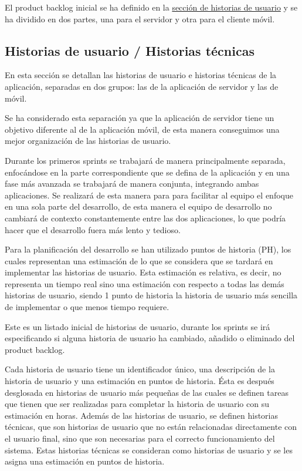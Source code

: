 El product backlog inicial se ha definido en la \hyperref[sec:historias-de-usuario]{sección de historias de usuario} y se ha dividido en dos partes, una para el servidor y otra para el cliente móvil.

\subsection{Historias de usuario / Historias técnicas}
\label{sec:historias-de-usuario}
En esta sección se detallan las historias de usuario e historias técnicas de la aplicación, separadas en dos grupos: las de la aplicación de servidor y las de móvil.

Se ha considerado esta separación ya que la aplicación de servidor tiene un objetivo diferente al de la aplicación móvil, de esta manera conseguimos una mejor organización de las historias de usuario.

Durante los primeros sprints se trabajará de manera principalmente separada, enfocándose en la parte correspondiente que se defina de la aplicación y en una fase más avanzada se trabajará de manera conjunta, integrando ambas aplicaciones. Se realizará de esta manera para para facilitar al equipo el enfoque en una sola parte del desarrollo, de esta manera el equipo de desarrollo no cambiará de contexto constantemente entre las dos aplicaciones, lo que podría hacer que el desarrollo fuera más lento y tedioso.

Para la planificación del desarrollo se han utilizado puntos de historia (PH), los cuales representan una estimación de lo que se considera que se tardará en implementar las historias de usuario. Esta estimación es relativa, es decir, no representa un tiempo real sino una estimación con respecto a todas las demás historias de usuario, siendo 1 punto de historia la historia de usuario más sencilla de implementar o que menos tiempo requiere.

Este es un listado inicial de historias de usuario, durante los sprints se irá especificando si alguna historia de usuario ha cambiado, añadido o eliminado del product backlog.

Cada historia de usuario tiene un identificador único, una descripción de la historia de usuario y una estimación en puntos de historia. Ésta es después desglosada en historias de usuario más pequeñas de las cuales se definen tareas que tienen que ser realizadas para completar la historia de usuario con su estimación en horas.
Además de las historias de usuario, se definen historias técnicas, que son historias de usuario que no están relacionadas directamente con el usuario final, sino que son necesarias para el correcto funcionamiento del sistema. Estas historias técnicas se consideran como historias de usuario y se les asigna una estimación en puntos de historia.

